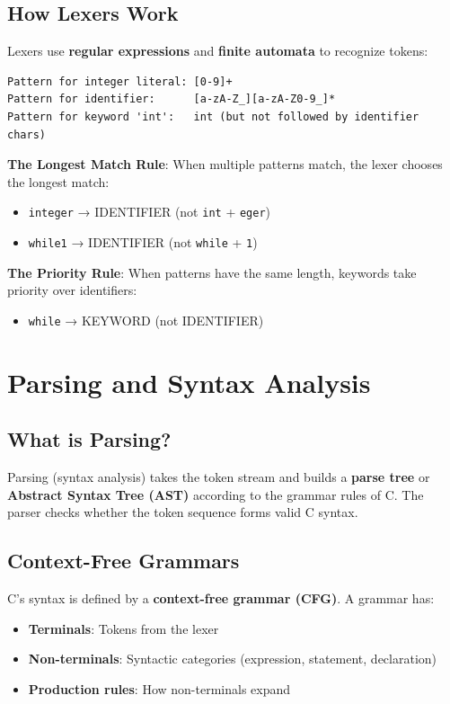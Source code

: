 \subsection{How Lexers Work}

Lexers use \textbf{regular expressions} and \textbf{finite automata} to recognize tokens:

\begin{verbatim}
Pattern for integer literal: [0-9]+
Pattern for identifier:      [a-zA-Z_][a-zA-Z0-9_]*
Pattern for keyword 'int':   int (but not followed by identifier chars)
\end{verbatim}

\textbf{The Longest Match Rule}: When multiple patterns match, the lexer chooses the longest match:
\begin{itemize}
    \item \texttt{integer} → IDENTIFIER (not \texttt{int} + \texttt{eger})
    \item \texttt{while1} → IDENTIFIER (not \texttt{while} + \texttt{1})
\end{itemize}

\textbf{The Priority Rule}: When patterns have the same length, keywords take priority over identifiers:
\begin{itemize}
    \item \texttt{while} → KEYWORD (not IDENTIFIER)
\end{itemize}

\section{Parsing and Syntax Analysis}

\subsection{What is Parsing?}

Parsing (syntax analysis) takes the token stream and builds a \textbf{parse tree} or \textbf{Abstract Syntax Tree (AST)} according to the grammar rules of C. The parser checks whether the token sequence forms valid C syntax.

\subsection{Context-Free Grammars}

C's syntax is defined by a \textbf{context-free grammar (CFG)}. A grammar has:
\begin{itemize}
    \item \textbf{Terminals}: Tokens from the lexer
    \item \textbf{Non-terminals}: Syntactic categories (expression, statement, declaration)
    \item \textbf{Production rules}: How non-terminals expand
\end{itemize}

